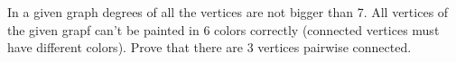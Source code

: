 \problem{}
In a given graph degrees of all the vertices are not bigger than 7.
All vertices of the given grapf can't be painted in 6 colors correctly
(connected vertices must have different colors).
Prove that there are 3 vertices pairwise connected.
\solution
\endproblem
